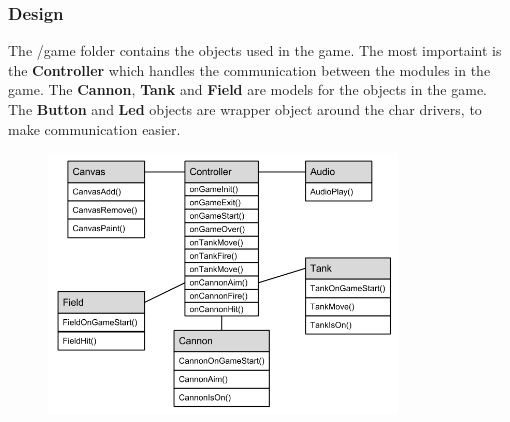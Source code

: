 \subsubsection{Design}

The /game folder contains the objects used in the game. The most importaint is the {\bf Controller}
which handles the communication between the modules in the game. The {\bf Cannon}, {\bf Tank} and
{\bf Field} are models for the objects in the game. The {\bf Button} and {\bf Led} objects are
wrapper object around the char drivers, to make communication easier.

\begin{figure}[h]
  \includegraphics[width=350px]{graphics/game_UML.png}
\end{figure}
